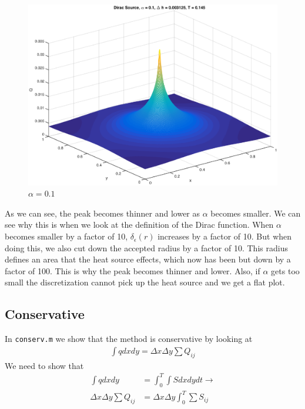 \begin{figure}[!htb]
\centering
\includegraphics[scale=.6]{4_2_a_2.eps}
\caption{$\alpha = 0.1$}
\label{fig:digraph}
\end{figure}

As we can see, the peak becomes thinner and lower as $\alpha$ becomes smaller. We can see why this is when we look at the definition of the Dirac function. When $\alpha$ becomes smaller by a factor of 10, $\delta_{\epsilon}(r)$ increases by a factor of 10. But when doing this, we also cut down the accepted radius by a factor of 10. This radius defines an area that the heat source effects, which now has been but down by a factor of 100. This is why the peak becomes thinner and lower. Also, if $\alpha$ gets too small the discretization cannot pick up the heat source and we get a flat plot. 

\subsection{Conservative}
In \texttt{conserv.m} we show that the method is conservative by looking at 
\begin{align*}
\int q dx dy = \Delta x \Delta y \sum Q_{ij}
\end{align*}
We need to show that
\begin{align*}
\int q dx dy &= \int_0^T \int S dx dy dt \rightarrow \\
\Delta x \Delta y \sum Q_{ij} &=  \Delta x \Delta y \int_0^T \sum S_{ij} %
\end{align*}

